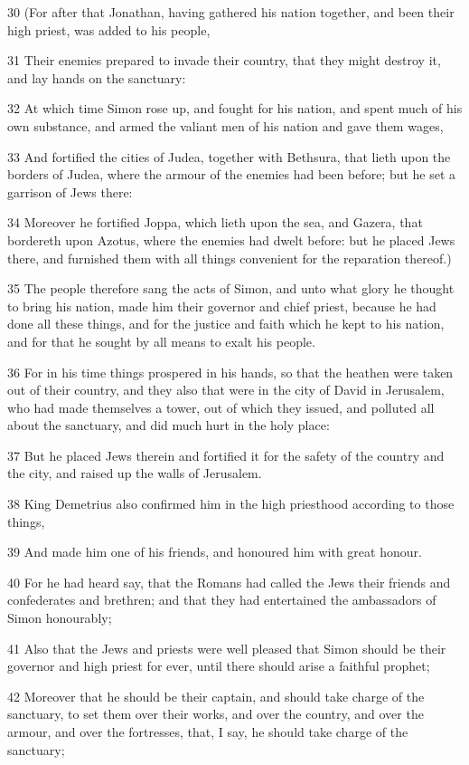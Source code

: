 \par 30 (For after that Jonathan, having gathered his nation together, and been their high priest, was added to his people,
\par 31 Their enemies prepared to invade their country, that they might destroy it, and lay hands on the sanctuary:
\par 32 At which time Simon rose up, and fought for his nation, and spent much of his own substance, and armed the valiant men of his nation and gave them wages,
\par 33 And fortified the cities of Judea, together with Bethsura, that lieth upon the borders of Judea, where the armour of the enemies had been before; but he set a garrison of Jews there:
\par 34 Moreover he fortified Joppa, which lieth upon the sea, and Gazera, that bordereth upon Azotus, where the enemies had dwelt before: but he placed Jews there, and furnished them with all things convenient for the reparation thereof.)
\par 35 The people therefore sang the acts of Simon, and unto what glory he thought to bring his nation, made him their governor and chief priest, because he had done all these things, and for the justice and faith which he kept to his nation, and for that he sought by all means to exalt his people.
\par 36 For in his time things prospered in his hands, so that the heathen were taken out of their country, and they also that were in the city of David in Jerusalem, who had made themselves a tower, out of which they issued, and polluted all about the sanctuary, and did much hurt in the holy place:
\par 37 But he placed Jews therein and fortified it for the safety of the country and the city, and raised up the walls of Jerusalem.
\par 38 King Demetrius also confirmed him in the high priesthood according to those things,
\par 39 And made him one of his friends, and honoured him with great honour.
\par 40 For he had heard say, that the Romans had called the Jews their friends and confederates and brethren; and that they had entertained the ambassadors of Simon honourably;
\par 41 Also that the Jews and priests were well pleased that Simon should be their governor and high priest for ever, until there should arise a faithful prophet;
\par 42 Moreover that he should be their captain, and should take charge of the sanctuary, to set them over their works, and over the country, and over the armour, and over the fortresses, that, I say, he should take charge of the sanctuary;
